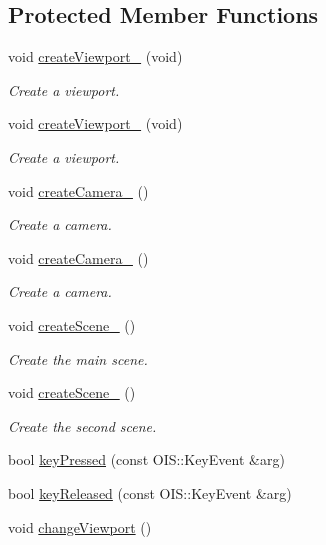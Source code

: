 \subsection*{Protected Member Functions}
\begin{DoxyCompactItemize}
\item 
void \mbox{\hyperlink{class_basic_tutorial__00_a6d4684502f2f7b2cf628a975d7750d8e}{create\+Viewport\+\_}} (void)
\begin{DoxyCompactList}\small\item\em Create a viewport. \end{DoxyCompactList}\item 
void \mbox{\hyperlink{class_basic_tutorial__00_a2801a2f0d91d80b471da48344d2ccccf}{create\+Viewport\+\_}} (void)
\begin{DoxyCompactList}\small\item\em Create a viewport. \end{DoxyCompactList}\item 
void \mbox{\hyperlink{class_basic_tutorial__00_a3479c50dbf8dc06a7ea77014eb94c6e7}{create\+Camera\+\_}} ()
\begin{DoxyCompactList}\small\item\em Create a camera. \end{DoxyCompactList}\item 
void \mbox{\hyperlink{class_basic_tutorial__00_a8745a127adeb69fa769f832fd41412c0}{create\+Camera\+\_}} ()
\begin{DoxyCompactList}\small\item\em Create a camera. \end{DoxyCompactList}\item 
void \mbox{\hyperlink{class_basic_tutorial__00_aa84173e509858146cbfb98274c1ef56e}{create\+Scene\+\_}} ()
\begin{DoxyCompactList}\small\item\em Create the main scene. \end{DoxyCompactList}\item 
void \mbox{\hyperlink{class_basic_tutorial__00_aad14e1ca565797c4b7dcff31bc0e1494}{create\+Scene\+\_}} ()
\begin{DoxyCompactList}\small\item\em Create the second scene. \end{DoxyCompactList}\item 
bool \mbox{\hyperlink{class_basic_tutorial__00_adc1a0b32d78b1980b3ee51a1b1e1e69b}{key\+Pressed}} (const O\+I\+S\+::\+Key\+Event \&arg)
\item 
bool \mbox{\hyperlink{class_basic_tutorial__00_aacca7a0a2a5a0e0d007b9c6c30b4941b}{key\+Released}} (const O\+I\+S\+::\+Key\+Event \&arg)
\item 
void \mbox{\hyperlink{class_basic_tutorial__00_a6ee6fde3630cd34a586432ba0f7547d7}{change\+Viewport}} ()
\end{DoxyCompactItemize}
